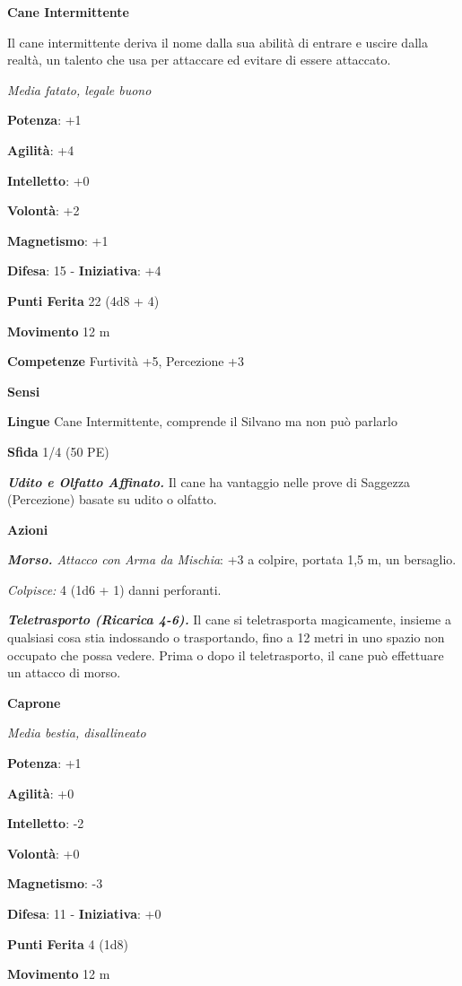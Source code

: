 \begin{multicols}{2}
\textbf{Cane Intermittente}

Il cane intermittente deriva il nome dalla sua abilità di entrare e
uscire dalla realtà, un talento che usa per attaccare ed evitare di
essere attaccato.

\emph{Media fatato, legale buono}

\textbf{Potenza}: +1

\textbf{Agilità}: +4

\textbf{Intelletto}: +0

\textbf{Volontà}: +2

\textbf{Magnetismo}: +1

\textbf{Difesa}: 15 - \textbf{Iniziativa}: +4

\textbf{Punti Ferita} 22 (4d8 + 4)

\textbf{Movimento} 12 m

\textbf{Competenze} Furtività +5, Percezione +3

\textbf{Sensi} 

\textbf{Lingue} Cane Intermittente, comprende il Silvano ma non può
parlarlo

\textbf{Sfida} 1/4 (50 PE)

\emph{\textbf{Udito e Olfatto Affinato.}} Il cane ha vantaggio nelle
prove di Saggezza (Percezione) basate su udito o olfatto.

\textbf{Azioni}

\emph{\textbf{Morso.} Attacco con Arma da Mischia}: +3 a colpire,
portata 1,5 m, un bersaglio.

\emph{Colpisce:} 4 (1d6 + 1) danni perforanti.

\emph{\textbf{Teletrasporto (Ricarica 4-6).}} Il cane si teletrasporta
magicamente, insieme a qualsiasi cosa stia indossando o trasportando,
fino a 12 metri in uno spazio non occupato che possa vedere. Prima o
dopo il teletrasporto, il cane può effettuare un attacco di morso.

\textbf{Caprone}

\emph{Media bestia, disallineato}

\textbf{Potenza}: +1

\textbf{Agilità}: +0

\textbf{Intelletto}: -2

\textbf{Volontà}: +0

\textbf{Magnetismo}: -3

\textbf{Difesa}: 11 - \textbf{Iniziativa}: +0

\textbf{Punti Ferita} 4 (1d8)

\textbf{Movimento} 12 m


\end{multicols}
